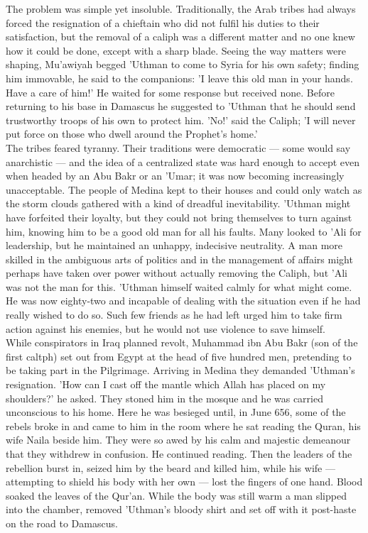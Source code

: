\documentclass[11pt, b5paper, twoside]{book}
\begin{document}
The problem was simple yet insoluble. Traditionally, the Arab tribes had always forced the resignation of a chieftain who did not fulfil his duties to their satisfaction, but the removal of a caliph was a different matter and no one knew how it could be done, except with a sharp blade. Seeing the way matters were shaping, Mu'awiyah begged 'Uthman to come to Syria for his own safety; finding him immovable, he said to the companions: 'I leave this old man in your hands. Have a care of him!' He waited for some response but received none. Before returning to his base in Damascus he suggested to 'Uthman that he should send trustworthy troops of his own to protect him. 'No!' said the Caliph; 'I will never put force on those who dwell around the Prophet's home.' \\

The tribes feared tyranny. Their traditions were democratic --- some would say anarchistic --- and the idea of a centralized state was hard enough to accept even when headed by an Abu Bakr or an 'Umar; it was now becoming increasingly unacceptable. The people of Medina kept to their houses and could only watch as the storm clouds gathered with a kind of dreadful inevitability. 'Uthman might have forfeited their loyalty, but they could not bring themselves to turn against him, knowing him to be a good old man for all his faults. Many looked to 'Ali for leadership, but he maintained an unhappy, indecisive neutrality. A man more skilled in the ambiguous arts of politics and in the management of affairs might perhaps have taken over power without actually removing the Caliph, but 'Ali was not the man for this. 'Uthman himself waited calmly for what might come. He was now eighty-two and incapable of dealing with the situation even if he had really wished to do so. Such few friends as he had left urged him to take firm action against his enemies, but he would not use violence to save himself. \\

While conspirators in Iraq planned revolt, Muhammad ibn Abu Bakr (son of the first caltph) set out from Egypt at the head of five hundred men, pretending to be taking part in the Pilgrimage. Arriving in Medina they demanded 'Uthman's resignation. 'How can I cast off the mantle which Allah has placed on my shoulders?' he asked. They stoned him in the mosque and he was carried unconscious to his home. Here he was besieged until, in June 656, some of the rebels broke in and came to him in the room where he sat reading the Quran, his wife Naila beside him. They were so awed by his calm and majestic demeanour that they withdrew in confusion. He continued reading. Then the leaders of the rebellion burst in, seized him by the beard and killed him, while his wife --- attempting to shield his body with her own --- lost the fingers of one hand. Blood soaked the leaves of the Qur'an. While the body was still warm a man slipped into the chamber, removed 'Uthman's bloody shirt and set off with it post-haste on the road to Damascus. \\
\end{document}
